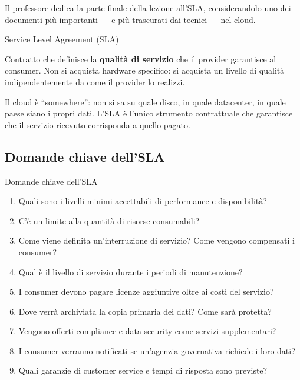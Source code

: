 \documentclass[
  italian,
  openany]{book}
\providecommand{\tightlist}{%
  \setlength{\itemsep}{0pt}\setlength{\parskip}{0pt}}
\begin{document}
Il professore dedica la parte finale della lezione all'SLA,
considerandolo uno dei documenti più importanti --- e più trascurati dai
tecnici --- nel cloud.

\begin{calloutdefinition}{Service Level Agreement (SLA)}

Contratto che definisce la \textbf{qualità di servizio} che il provider
garantisce al consumer. Non si acquista hardware specifico: si acquista
un livello di qualità indipendentemente da come il provider lo realizzi.

\end{calloutdefinition}

Il cloud è ``somewhere'': non si sa su quale disco, in quale datacenter,
in quale paese siano i propri dati. L'SLA è l'unico strumento
contrattuale che garantisce che il servizio ricevuto corrisponda a
quello pagato.

\subsection{Domande chiave dell'SLA}\label{domande-chiave-dellsla}

\begin{calloutquestion}{Domande chiave dell’SLA}

\begin{enumerate}
\def\labelenumi{\arabic{enumi}.}
\tightlist
\item
  Quali sono i livelli minimi accettabili di performance e
  disponibilità?
\item
  C'è un limite alla quantità di risorse consumabili?
\item
  Come viene definita un'interruzione di servizio? Come vengono
  compensati i consumer?
\item
  Qual è il livello di servizio durante i periodi di manutenzione?
\item
  I consumer devono pagare licenze aggiuntive oltre ai costi del
  servizio?
\item
  Dove verrà archiviata la copia primaria dei dati? Come sarà protetta?
\item
  Vengono offerti compliance e data security come servizi supplementari?
\item
  I consumer verranno notificati se un'agenzia governativa richiede i
  loro dati?
\item
  Quali garanzie di customer service e tempi di risposta sono previste?
\end{enumerate}

\end{calloutquestion}
\end{document}
